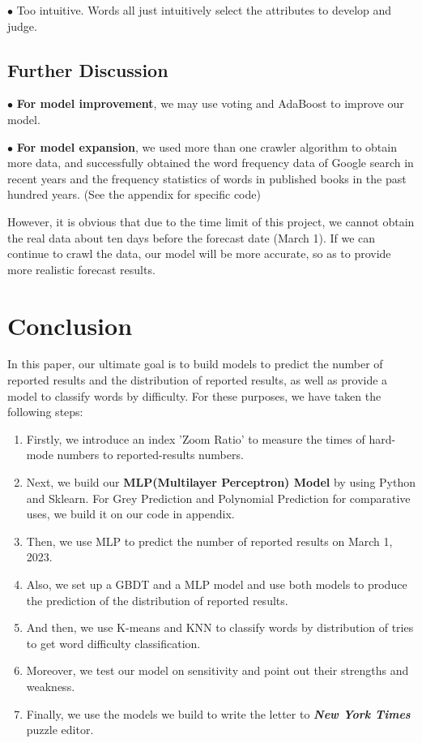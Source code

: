 \documentclass[12pt]{article}
\begin{document}
$\bullet$ Too intuitive. Words all just intuitively select the attributes to develop and judge.
\subsection{Further Discussion}
$\bullet$ \textbf{For model improvement}, we may use voting and AdaBoost to improve our model.
 
$\bullet$ \textbf{For model expansion}, we used more than one crawler algorithm to obtain more data, and successfully obtained the word frequency data of Google search in recent years and the frequency statistics of words in published books in the past hundred years. (See the appendix for specific code)

However, it is obvious that due to the time limit of this project, we cannot obtain the real data about ten days before the forecast date (March 1). If we can continue to crawl the data, our model will be more accurate, so as to provide more realistic forecast results.

\section{Conclusion}
In this paper, our ultimate goal is to build models to predict the number of reported results and the distribution of reported results, as well as provide a model to classify words by difficulty. For these purposes, we have taken the following steps:
 \begin{enumerate}
	\item Firstly, we introduce an index 'Zoom Ratio' to measure the times of hard-mode numbers to reported-results numbers.
	\item Next, we build our \textbf{MLP(Multilayer Perceptron) Model} by using Python and Sklearn. For Grey Prediction and Polynomial Prediction for comparative uses, we build it on our code in appendix. 
	\item Then, we use MLP to predict the number of reported results on March 1, 2023.
	\item Also, we set up a GBDT and a MLP model and use both models to produce the prediction of the distribution of reported results.
	\item And then, we use K-means and KNN to classify words by distribution of tries to get word difficulty classification.
	\item Moreover, we test our model on sensitivity and point out their strengths and weakness.
	\item Finally, we use the models we build to write the letter to \textbf{\textit{New York Times}} puzzle editor.
 \end{enumerate}
\end{document}
